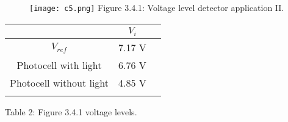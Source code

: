 \begin{figure}[H]
\texttt{[image: c5.png]}
\centering \linebreak \linebreak Figure 3.4.1: Voltage level detector application II.
\end{figure} \hfill

\begin{center}
\begin{tabular}[.5cm]{c c c}
\toprule
\toprule
\hspace{200pt} & \hspace{100pt} $V_{i}$ \hspace{100pt}  \\
\midrule
\midrule
$V_{ref}$ & 7.17 V \\
\cmidrule{1-2}
Photocell with light & 6.76 V \\
\cmidrule{1-2}
Photocell without light & 4.85 V \\
\bottomrule
\linebreak
\end{tabular}
\linebreak Table 2: Figure 3.4.1 voltage levels.
\end{center} \hfill

\pagebreak